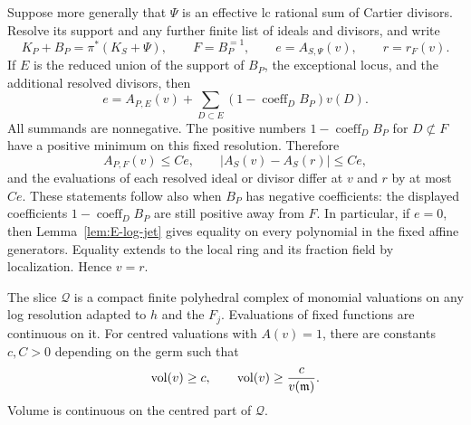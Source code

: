 Suppose more generally that $\Psi$ is an effective lc rational sum of
Cartier divisors. Resolve its support and any further finite list of
ideals and divisors, and write
\[
 K_P+B_P=\pi^*(K_S+\Psi),\qquad F=B_P^{=1},\qquad
 e=A_{S,\Psi}(v),\qquad r=r_F(v).
\]
If $E$ is the reduced union of the support of $B_P$, the exceptional
locus, and the additional resolved divisors, then
\[
 e=A_{P,E}(v)+\sum_{D\subset E}(1-\operatorname{coeff}_D B_P)v(D).
\]
All summands are nonnegative. The positive numbers
$1-\operatorname{coeff}_D B_P$ for $D\not\subset F$ have a positive
minimum on this fixed resolution. Therefore
\begin{equation}\label{eq:E-retraction-errors}
 A_{P,F}(v)\le C e,\qquad
 |A_S(v)-A_S(r)|\le C e,
\end{equation}
and the evaluations of each resolved ideal or divisor differ at $v$
and $r$ by at most $Ce$. These statements follow also when $B_P$ has
negative coefficients: the displayed coefficients $1-\operatorname{coeff}_D B_P$
are still positive away from $F$. In particular, if $e=0$, then
Lemma~\ref{lem:E-log-jet} gives equality on every polynomial in the
fixed affine generators. Equality extends to the local ring and its
fraction field by localization. Hence $v=r$.

\begin{lemma}\label{lem:E-compactness}
The slice $\mathcal Q$ is a compact finite polyhedral complex of
monomial valuations on any log resolution adapted to $h$ and the
$F_j$. Evaluations of fixed functions are continuous on it.
For centred valuations with $A(v)=1$, there are constants $c,C>0$
depending on the germ such that
\begin{equation}\label{eq:E-centering}
 \operatorname{vol}(v)\ge c,\qquad
 \operatorname{vol}(v)\ge \frac{c}{v(\mathfrak m)}.
\end{equation}
Volume is continuous on the centred part of $\mathcal Q$.
\end{lemma}

